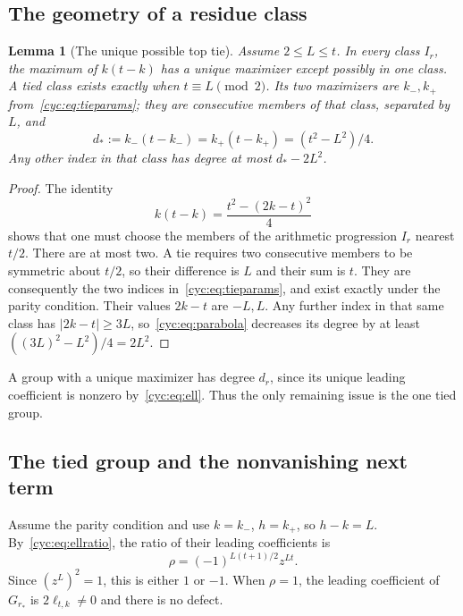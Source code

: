 \documentclass[11pt,a4paper]{article}
\numberwithin{equation}{section}
\newtheorem{lemma}[theorem]{Lemma}
\theoremstyle{definition}
\theoremstyle{remark}
\begin{document}
\subsection{The geometry of a residue class}
\begin{lemma}[The unique possible top tie]\label{cyc:lem:tie}
Assume $2\le L\le t$.  In every class $I_r$, the maximum of
$k(t-k)$ has a unique maximizer except possibly in one class.
A tied class exists exactly when $t\equiv L\pmod2$.  Its two
maximizers are $k_-,k_+$ from~\eqref{cyc:eq:tieparams}; they are consecutive
members of that class, separated by $L$, and
\begin{equation}\label{cyc:eq:tiedegree}
 d_*:=k_-(t-k_-)=k_+ (t-k_+)=(t^2-L^2)/4.
\end{equation}
Any other index in that class has degree at most $d_*-2L^2$.
\end{lemma}
\begin{proof}
The identity
\begin{equation}\label{cyc:eq:parabola}
 k(t-k)=\frac{t^2-(2k-t)^2}{4}
\end{equation}
shows that one must choose the members of the arithmetic progression
$I_r$ nearest $t/2$.  There are at most two.  A tie requires two
consecutive members to be symmetric about $t/2$, so their difference
is $L$ and their sum is $t$.  They are consequently the two indices
in~\eqref{cyc:eq:tieparams}, and exist exactly under the parity condition.
Their values $2k-t$ are $-L,L$.  Any further index in that same class
has $|2k-t|\ge3L$, so~\eqref{cyc:eq:parabola} decreases its degree by at
least $((3L)^2-L^2)/4=2L^2$.
\end{proof}

A group with a unique maximizer has degree $d_r$, since its unique
leading coefficient is nonzero by~\eqref{cyc:eq:ell}.  Thus the only
remaining issue is the one tied group.

\subsection{The tied group and the nonvanishing next term}
Assume the parity condition and use $k=k_-$, $h=k_+$, so $h-k=L$.
By~\eqref{cyc:eq:ellratio}, the ratio of their leading coefficients is
\begin{equation}\label{cyc:eq:rho}
 \rho=(-1)^{L(t+1)/2}z^{Lt}.
\end{equation}
Since $(z^L)^2=1$, this is either $1$ or $-1$.  When $\rho=1$,
the leading coefficient of $G_{r_*}$ is $2\ell_{t,k}\ne0$ and
there is no defect.
\end{document}
